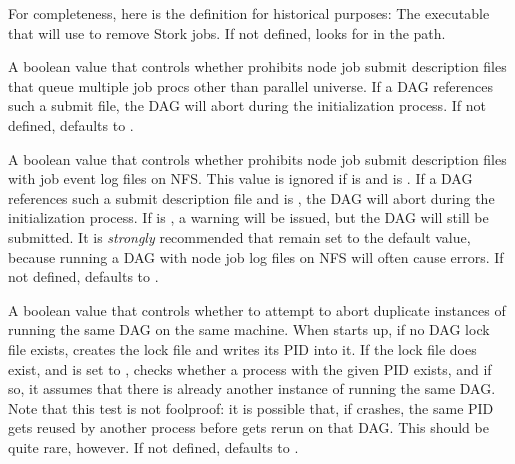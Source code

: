 \begin{description}
  For completeness, here is the definition for historical purposes: 
  The executable that  will use to remove Stork jobs.
  If not defined,  looks for  in the path.

\label{param:DAGManProhibitMultiJobs}
\item[\Macro{DAGMAN\_PROHIBIT\_MULTI\_JOBS}]
  A boolean value that controls whether  prohibits
  node job submit description files that queue multiple job procs other than 
  parallel universe.  If a DAG references such a submit file, the
  DAG will abort during the initialization process.  If not defined,
   defaults to .

\label{param:DAGManLogOnNfsIsError}
\item[\Macro{DAGMAN\_LOG\_ON\_NFS\_IS\_ERROR}]
  A boolean value that controls whether  prohibits
  node job submit description files with job event log files on NFS.
  This value is ignored if  is 
   and
   is .
  If a DAG references such a submit description file and
   is ,
  the DAG will abort during the initialization process. 
  If  is , a warning
  will be issued, but the DAG will still be submitted.
  It is \emph{strongly}
  recommended that 
  remain set to the default value, because running a DAG with node job
  log files on NFS will often cause errors.
  If not defined,  defaults to
  .

\label{param:DAGManAbortDuplicates}
\item[\Macro{DAGMAN\_ABORT\_DUPLICATES}]
  A boolean value that controls whether to attempt to abort duplicate
  instances of  running the same DAG on the same
  machine.  When  starts up, if no DAG lock file exists,
   creates the lock file and writes its PID into it.  If
  the lock file does exist, and  is
  set to ,  checks whether a process with the
  given PID exists, and if so, it assumes that there is already another
  instance of  running the same DAG.  Note that this
  test is not foolproof: it is possible that, if  crashes,
  the same PID gets reused by another process before 
  gets rerun on that DAG.  This should be quite rare, however.
  If not defined,  defaults to
  .


\end{description}
